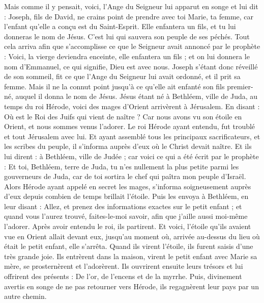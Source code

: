 \begin{multicols}{2}
Mais comme il y pensait, voici, l'Ange du Seigneur lui apparut en songe et lui dit : Joseph, fils de David, ne crains point de prendre avec toi Marie, ta femme, car l’enfant qu’elle a conçu est du Saint-Esprit.
Elle enfantera un fils, et tu lui donneras le nom de Jésus. C’est lui qui sauvera son peuple de ses péchés.
Tout cela arriva afin que s’accomplisse ce que le Seigneur avait annoncé par le prophète :
Voici, la vierge deviendra enceinte, elle enfantera un fils ; et on lui donnera le nom d’Emmanuel{}, ce qui signifie, Dieu est avec nous.
Joseph s’étant donc réveillé de son sommeil, fit ce que l'Ange du Seigneur lui avait ordonné, et il prit sa femme.
Mais il ne la connut point jusqu'à ce qu'elle ait enfanté son fils premier-né, auquel il donna le nom de Jésus.
\VerseOne{}Jésus étant né à Bethléem, ville de Juda, au temps du roi Hérode, voici des mages d'Orient arrivèrent à Jérusalem.
En disant : Où est le Roi des Juifs qui vient de naître ? Car nous avons vu son étoile en Orient, et nous sommes venus l'adorer.
Le roi Hérode ayant entendu, fut troublé et tout Jérusalem avec lui.
Et ayant assemblé tous les principaux sacrificateurs, et les scribes du peuple, il s'informa auprès d'eux où le Christ devait naître.
Et ils lui dirent : à Bethléem, ville de Judée ; car voici ce qui a été écrit par le prophète :
Et toi, Bethléem, terre de Juda, tu n'es nullement la plus petite parmi les gouverneurs de Juda, car de toi sortira le chef qui paîtra mon peuple d'Israël{}.
Alors Hérode ayant appelé en secret les mages, s'informa soigneusement auprès d’eux depuis combien de temps brillait l'étoile.
Puis les envoya à Bethléem, en leur disant : Allez, et prenez des informations exactes sur le petit enfant ; et quand vous l'aurez trouvé, faites-le-moi savoir, afin que j’aille aussi moi-même l’adorer.
Après avoir entendu le roi, ils partirent. Et voici, l'étoile{} qu'ils avaient vue en Orient allait devant eux, jusqu’au moment où, arrivée au-dessus du lieu où était le petit enfant, elle s’arrêta.
Quand ils virent l'étoile, ils furent saisis d’une très grande joie.
Ils entrèrent dans la maison, virent le petit enfant avec Marie sa mère, se prosternèrent et l’adorèrent. Ils ouvrirent ensuite leurs trésors et lui offrirent des présents : De l'or, de l'encens et de la myrrhe.
Puis, divinement avertis en songe de ne pas retourner vers Hérode, ils regagnèrent leur pays par un autre chemin.

\end{multicols}
